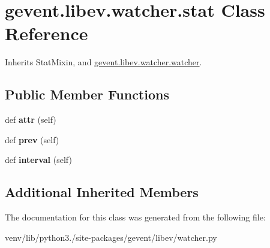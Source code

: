 \hypertarget{classgevent_1_1libev_1_1watcher_1_1stat}{}\section{gevent.\+libev.\+watcher.\+stat Class Reference}
\label{classgevent_1_1libev_1_1watcher_1_1stat}


Inherits Stat\+Mixin, and \hyperlink{classgevent_1_1libev_1_1watcher_1_1watcher}{gevent.\+libev.\+watcher.\+watcher}.

\subsection*{Public Member Functions}
\begin{DoxyCompactItemize}
\item 
\mbox{\label{classgevent_1_1libev_1_1watcher_1_1stat_ae32a0072bce49242404d7205bf99eeb0}} 
def {\bfseries attr} (self)
\item 
\mbox{\label{classgevent_1_1libev_1_1watcher_1_1stat_ad845f212e8ed25ba5901f7e0b0338383}} 
def {\bfseries prev} (self)
\item 
\mbox{\label{classgevent_1_1libev_1_1watcher_1_1stat_af0044f78559f534e2be7d3f66eea6a37}} 
def {\bfseries interval} (self)
\end{DoxyCompactItemize}
\subsection*{Additional Inherited Members}


The documentation for this class was generated from the following file\+:\begin{DoxyCompactItemize}
\item 
venv/lib/python3./site-\/packages/gevent/libev/watcher.\+py\end{DoxyCompactItemize}
